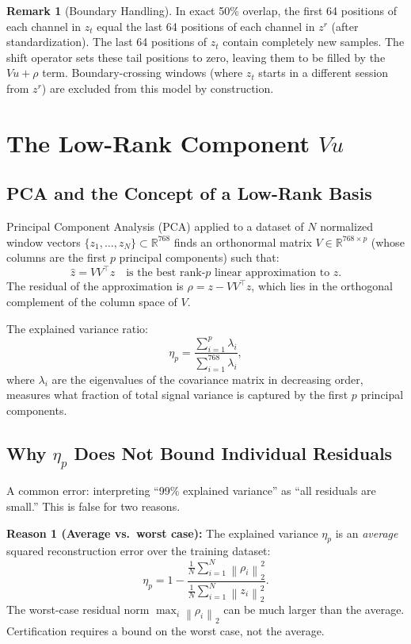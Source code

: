 \documentclass[11pt, a4paper]{article}
\theoremstyle{definition}
\newtheorem{remark}{Remark}[section]
\theoremstyle{plain}
\newcommand{\R}{\mathbb{R}}
\newcommand{\norm}[2]{\left\|#1\right\|_{#2}}
\begin{document}
\begin{remark}[Boundary Handling]
  In exact 50\% overlap, the first 64 positions of each channel in $z_t$ equal the
  last 64 positions of each channel in $z^r$ (after standardization). The last 64
  positions of $z_t$ contain completely new samples. The shift operator sets these
  tail positions to zero, leaving them to be filled by the $Vu + \rho$ term.
  Boundary-crossing windows (where $z_t$ starts in a different session from $z^r$)
  are excluded from this model by construction.
\end{remark}

\section{The Low-Rank Component $Vu$}

\subsection{PCA and the Concept of a Low-Rank Basis}

Principal Component Analysis (PCA) applied to a dataset of $N$ normalized window
vectors $\{z_1, \ldots, z_N\} \subset \R^{768}$ finds an orthonormal matrix
$V \in \R^{768 \times p}$ (whose columns are the first $p$ principal components)
such that:
\begin{equation}
  \hat{z} = V V^\top z \quad \text{is the best rank-$p$ linear approximation to } z.
\end{equation}
The residual of the approximation is $\rho = z - V V^\top z$, which lies in the
orthogonal complement of the column space of $V$.

The explained variance ratio:
\[
  \eta_p = \frac{\sum_{i=1}^p \lambda_i}{\sum_{i=1}^{768} \lambda_i},
\]
where $\lambda_i$ are the eigenvalues of the covariance matrix in decreasing order,
measures what fraction of total signal variance is captured by the first $p$
principal components.

\subsection{Why $\eta_p$ Does Not Bound Individual Residuals}

A common error: interpreting ``99\% explained variance'' as ``all residuals are small.''
This is false for two reasons.

\textbf{Reason 1 (Average vs.\ worst case):} The explained variance $\eta_p$ is an
\emph{average} squared reconstruction error over the training dataset:
\[
  \eta_p = 1 - \frac{\frac{1}{N} \sum_{i=1}^N \norm{\rho_i}{2}^2}{\frac{1}{N}\sum_{i=1}^N \norm{z_i}{2}^2}.
\]
The worst-case residual norm $\max_i \norm{\rho_i}{2}$ can be much larger than the
average. Certification requires a bound on the worst case, not the average.
\end{document}
